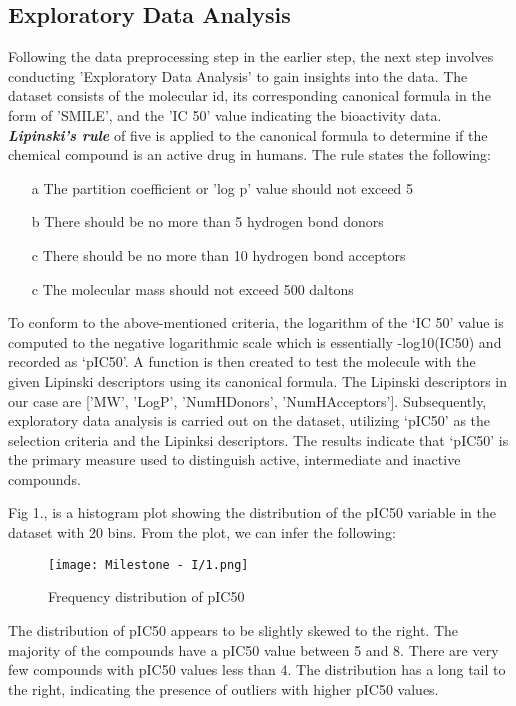 \documentclass[fleqn,10pt]{SelfArx} %
\begin{document}
\subsection{Exploratory Data Analysis}
Following the data preprocessing step in the earlier step, the next step involves conducting 'Exploratory Data Analysis' to gain insights into the data. The dataset consists of the molecular id, its corresponding canonical formula in the form of 'SMILE', and the 'IC 50' value indicating the bioactivity data. \textbf{\textit{Lipinski's rule}} of five is applied to the canonical formula to determine if the chemical compound is an active drug in humans. The rule states the following:
\begin{itemize}
    \item [a] The partition coefficient or 'log p' value should not exceed 5
    \item [b] There should be no more than 5 hydrogen bond donors
    \item [c] There should be no more than 10 hydrogen bond acceptors
    \item [c] The molecular mass should not exceed 500 daltons
\end{itemize}

To conform to the above-mentioned criteria, the logarithm of the ‘IC 50’ value is computed to the negative logarithmic scale which is essentially -log10(IC50) and recorded as ‘pIC50’. A function is then created to test the molecule with the given Lipinski descriptors using its canonical formula. The Lipinski descriptors in our case are ['MW', 'LogP', 'NumHDonors', 'NumHAcceptors']. Subsequently, exploratory data analysis is carried out on the dataset, utilizing ‘pIC50’ as the selection criteria and the Lipinksi descriptors. The results indicate that ‘pIC50’ is the primary measure used to distinguish active, intermediate and inactive compounds.

Fig 1., is a histogram plot showing the distribution of the pIC50 variable in the dataset with 20 bins. From the plot, we can infer the following:
\begin{figure}[h!]
    \centering
    \texttt{[image: Milestone - I/1.png]}
    \caption{Frequency distribution of pIC50}
    \label{fig:Frequency distribution of pIC50}
\end{figure}

The distribution of pIC50 appears to be slightly skewed to the right. The majority of the compounds have a pIC50 value between 5 and 8. There are very few compounds with pIC50 values less than 4. The distribution has a long tail to the right, indicating the presence of outliers with higher pIC50 values. 
\end{document}

